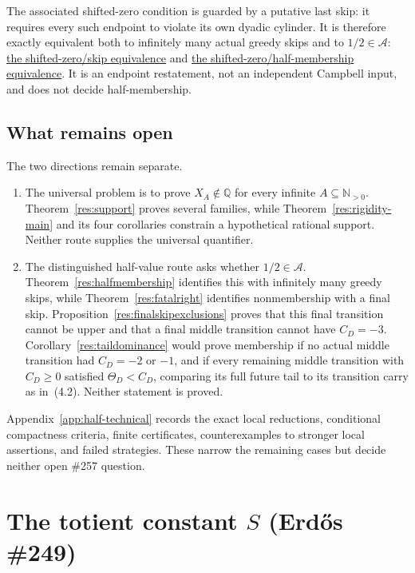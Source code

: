 \documentclass[11pt]{article}
\newcommand{\commit}{ebc98ee71f6819bd9fe344a0bb343542c604e533}
\newcommand{\repobase}{https://github.com/wcook04/plectis-lean-erdos249-257/blob/\commit}
\newcommand{\PK}{Erdos249257}
\newcommand{\lword}[4]{\href{\repobase/\PK/#1\#L#2}{#4}}
\theoremstyle{definition}
\theoremstyle{remark}
\newcommand{\Npos}{\mathbb{N}_{>0}}
\newcommand{\Q}{\mathbb{Q}}
\begin{document}
{The associated shifted-zero condition is guarded by a putative last skip: it
requires every such endpoint to violate its own dyadic cylinder.  It is
therefore exactly equivalent both to infinitely many actual greedy skips and
to $1/2\in\mathcal A$:
\lword{CampbellShiftSynchronization.lean}{471}{shiftWindowZero_iff_greedyMersenneSkippedSupport_infinite}{the shifted-zero/skip equivalence}
and
\lword{CampbellShiftSynchronization.lean}{488}{shiftWindowZero_iff_half_mem_mersenneAchievementSet}{the shifted-zero/half-membership equivalence}.
It is an endpoint restatement, not an independent Campbell input, and does
not decide half-membership.

}

\subsection{What remains open}

The two directions remain separate.
\begin{enumerate}[label=\textup{(\alph*)},leftmargin=2.2em]
\item The universal problem is to prove \(X_A\notin\Q\) for every infinite
\(A\subseteq\Npos\).  Theorem~\ref{res:support} proves several
families, while Theorem~\ref{res:rigidity-main} and its four corollaries
constrain a hypothetical rational support.  Neither route supplies the
universal quantifier.
\item The distinguished half-value route asks whether \(1/2\in\mathcal A\).
Theorem~\ref{res:halfmembership} identifies this with infinitely many greedy
skips, while Theorem~\ref{res:fatalright} identifies nonmembership with a
final skip.  Proposition~\ref{res:finalskipexclusions} proves that this final
transition cannot be upper and that a final middle transition cannot have
\(C_D=-3\).  Corollary~\ref{res:taildominance} would prove membership if no
actual middle transition had \(C_D=-2\) or \(-1\), and if every remaining
middle transition with \(C_D\geq0\) satisfied
\(\Theta_D<C_D\), comparing its full future tail to its transition carry
as in~\textup{(4.2)}.  Neither statement is proved.
\end{enumerate}
Appendix~\ref{app:half-technical} records the exact local reductions,
conditional compactness criteria, finite certificates, counterexamples to
stronger local assertions, and failed strategies.  These narrow the remaining
cases but decide neither open \#257 question.

\section{The totient constant $S$ (Erd\H{o}s \#249)}\label{sec:249}
\end{document}
